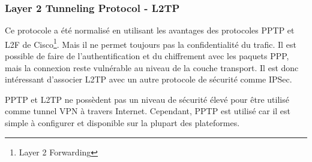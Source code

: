 \subsubsection{Layer 2 Tunneling Protocol - L2TP}
Ce protocole a été normalisé en utilisant les avantages des protocoles PPTP et L2F de Cisco\footnote{Layer 2 Forwarding}. 
Mais il ne permet toujours pas la confidentialité du trafic. 
Il est possible de faire de l'authentification et du chiffrement avec les paquets PPP, mais la connexion reste vulnérable au niveau de la couche transport. 
Il est donc intéressant d'associer L2TP avec un autre protocole de sécurité comme IPSec.

PPTP  et L2TP ne possèdent pas un niveau de sécurité élevé pour être utilisé comme tunnel VPN à travers Internet.
Cependant, PPTP est utilisé car il est simple à configurer et disponible sur la plupart des plateformes.